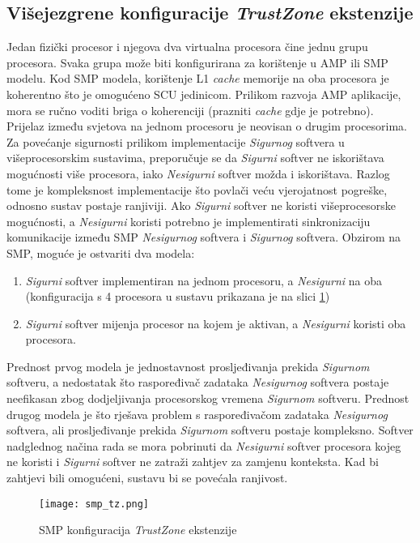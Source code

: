\documentclass[times, utf8, diplomski, numeric]{fer}
\begin{document}
\subsection{Višejezgrene konfiguracije \textit{TrustZone} ekstenzije}
Jedan fizički procesor i njegova dva virtualna procesora čine jednu grupu procesora. Svaka grupa može biti konfigurirana za
korištenje u AMP ili SMP modelu. Kod SMP modela, korištenje L1 \textit{cache} memorije na oba procesora je koherentno što
je omogućeno SCU jedinicom. Prilikom razvoja AMP aplikacije, mora se ručno voditi briga o koherenciji (prazniti \textit{cache}
gdje je potrebno). Prijelaz između svjetova na jednom procesoru je neovisan o drugim procesorima. Za povećanje sigurnosti
prilikom implementacije \textit{Sigurnog} softvera u višeprocesorskim sustavima, preporučuje se da \textit{Sigurni} softver ne iskorištava
mogućnosti više procesora, iako \textit{Nesigurni} softver možda i iskorištava. Razlog tome je kompleksnost implementacije što povlači
veću vjerojatnost pogreške, odnosno sustav postaje ranjiviji. Ako \textit{Sigurni} softver ne koristi višeprocesorske mogućnosti,
a \textit{Nesigurni} koristi potrebno je implementirati sinkronizaciju komunikacije između SMP \textit{Nesigurnog} softvera i \textit{Sigurnog} softvera.
Obzirom na SMP, moguće je ostvariti dva modela:
\begin{enumerate}
  \item{\textit{Sigurni} softver implementiran na jednom procesoru, a \textit{Nesigurni} na oba (konfiguracija s 4 procesora u sustavu prikazana
  je na slici \ref{smp_tz})}
  \item{\textit{Sigurni} softver mijenja procesor na kojem je aktivan, a \textit{Nesigurni} koristi oba procesora.}
\end{enumerate}
Prednost prvog modela je jednostavnost prosljeđivanja prekida \textit{Sigurnom} softveru, a nedostatak što raspoređivač zadataka
\textit{Nesigurnog} softvera postaje neefikasan zbog dodjeljivanja procesorskog vremena \textit{Sigurnom} softveru. Prednost drugog modela je
što rješava problem s raspoređivačom zadataka \textit{Nesigurnog} softvera, ali prosljeđivanje prekida \textit{Sigurnom} softveru postaje
kompleksno. Softver nadglednog načina rada se mora pobrinuti da \textit{Nesigurni} softver procesora kojeg ne koristi i \textit{Sigurni} softver
ne zatraži zahtjev za zamjenu konteksta. Kad bi zahtjevi bili omogućeni, sustavu bi se povećala ranjivost.
\begin{figure}[H]
  \centering
	\texttt{[image: smp\_tz.png]}%
	\caption{SMP konfiguracija \textit{TrustZone} ekstenzije \cite{tz_wp}}
	\label{smp_tz}%
\end{figure}
\end{document}

